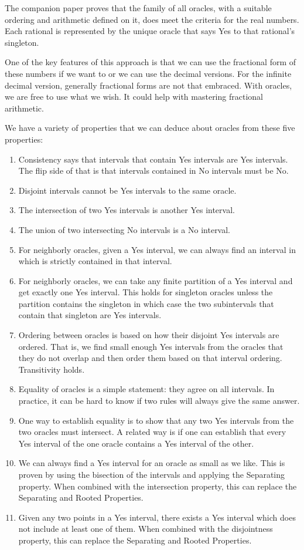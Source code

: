\documentclass[12pt]{article}
\theoremstyle{remark}
\begin{document}
The companion paper proves that the family of all oracles, with a suitable ordering and arithmetic defined on it, does meet the criteria for the real numbers. Each rational is represented by the unique oracle that says Yes to that rational's singleton. 

One of the key features of this approach is that we can use the fractional form of these numbers if we want to or we can use the decimal versions. For the infinite decimal version, generally fractional forms are not that embraced. With oracles, we are free to use what we wish. It could help with mastering fractional arithmetic. 

We have a variety of properties that we can deduce about oracles from these five properties: 
\begin{enumerate}
    \item Consistency says that intervals that contain Yes intervals are Yes intervals. The flip side of that is that intervals contained in No intervals must be No. 
    \item Disjoint intervals cannot be Yes intervals to the same oracle.
    \item The intersection of two Yes intervals is another Yes interval. 
    \item The union of two intersecting No intervals is a No interval. 
    \item For neighborly oracles, given a Yes interval, we can always find an interval in which is strictly contained in that interval. 
    \item For neighborly oracles, we can take any finite partition of a Yes interval and get exactly one Yes interval. This holds for singleton oracles unless the partition contains the singleton in which case the two subintervals that contain that singleton are Yes intervals. 
    \item Ordering between oracles is based on how their disjoint Yes intervals are ordered. That is, we find small enough Yes intervals from the oracles that they do not overlap and then order them based on that interval ordering. Transitivity holds. 
    \item Equality of oracles is a simple statement: they agree on all intervals. In practice, it can be hard to know if two rules will always give the same answer. 
    \item One way to establish equality is to show that any two Yes intervals from the two oracles must intersect. A related way is if one can establish that every Yes interval of the one oracle contains a Yes interval of the other. 
    \item We can always find a Yes interval for an oracle as small as we like. This is proven by using the bisection of the intervals and applying the Separating property. When combined with the intersection property, this can replace the Separating and Rooted Properties. 
    \item Given any two points in a Yes interval, there exists a Yes interval which does not include at least one of them. When combined with the disjointness property, this can replace the Separating and Rooted Properties. 
\end{enumerate}
\end{document}

